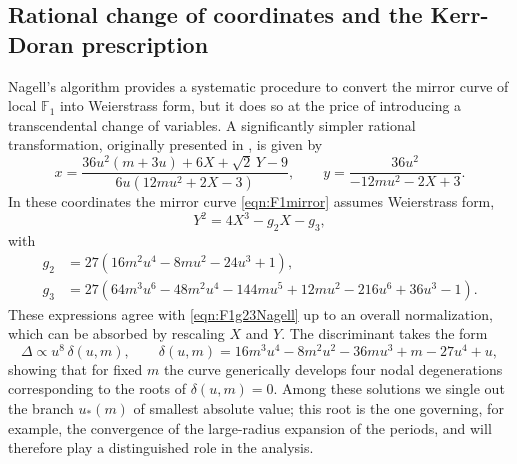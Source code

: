 \documentclass[11pt, a4paper]{article}
\numberwithin{equation}{section}
\begin{document}
\subsection{Rational change of coordinates and the Kerr-Doran prescription}

Nagell’s algorithm provides a systematic procedure to convert the mirror curve of local $\mathbb{F}_1$ into Weierstrass form, but it does so at the price of introducing a transcendental change of variables. A significantly simpler rational transformation, originally presented in \cite{Marino:LocalF1Notes}, is given by
\begin{equation}
  x = \frac{36 u^2 (m+3 u)+6 X+\sqrt{2}\, Y-9}{6 u \left(12 m u^2+2 X-3\right)}, 
  \qquad 
  y = \frac{36 u^2}{-12 m u^2-2 X+3}.
\end{equation}
In these coordinates the mirror curve \cref{eqn:F1mirror} assumes Weierstrass form,
\begin{equation}
  Y^2 = 4X^3 - g_2 X - g_3,
\end{equation}
with
\begin{equation}
\begin{aligned}
  g_2 &= 27\left( 16 m^2 u^4 - 8 m u^2 - 24 u^3 + 1 \right), \\
  g_3 &= 27\left( 64 m^3 u^6 - 48 m^2 u^4 - 144 m u^5 + 12 m u^2 - 216 u^6 + 36 u^3 - 1 \right).
\end{aligned}
\end{equation}
These expressions agree with \cref{eqn:F1g23Nagell} up to an overall normalization, which can be absorbed by rescaling $X$ and $Y$. The discriminant takes the form
\begin{equation}
  \Delta \propto u^8\, \delta(u,m),
  \qquad
  \delta(u,m) = 16 m^3 u^4 - 8 m^2 u^2 - 36 m u^3 + m - 27 u^4 + u,
\end{equation}
showing that for fixed $m$ the curve generically develops four nodal degenerations corresponding to the roots of $\delta(u,m)=0$. Among these solutions we single out the branch $u_{*}(m)$ of smallest absolute value; this root is the one governing, for example, the convergence of the large-radius expansion of the periods, and will therefore play a distinguished role in the analysis.
\end{document}
